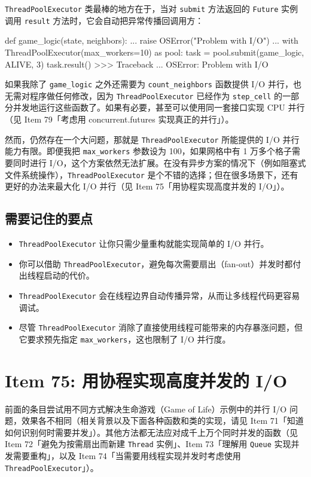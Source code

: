 \texttt{ThreadPoolExecutor} 类最棒的地方在于，当对 \texttt{submit} 方法返回的 \texttt{Future} 实例调用 \texttt{result} 方法时，它会自动把异常传播回调用方：

\begin{codebox}[python]
def game_logic(state, neighbors):
    ...
    raise OSError("Problem with I/O")
    ...
with ThreadPoolExecutor(max_workers=10) as pool:
    task = pool.submit(game_logic, ALIVE, 3)
    task.result()
>>>
Traceback ...
OSError: Problem with I/O
\end{codebox}

如果我除了 \texttt{game\_logic} 之外还需要为 \texttt{count\_neighbors} 函数提供 I/O 并行，也无需对程序做任何修改，因为 \texttt{ThreadPoolExecutor} 已经作为 \texttt{step\_cell} 的一部分并发地运行这些函数了。如果有必要，甚至可以使用同一套接口实现 CPU 并行（见 Item 79「考虑用 concurrent.futures 实现真正的并行」）。

然而，仍然存在一个大问题，那就是 \texttt{ThreadPoolExecutor} 所能提供的 I/O 并行能力有限。即便我把 \texttt{max\_workers} 参数设为 100，如果网格中有 1 万多个格子需要同时进行 I/O，这个方案依然无法扩展。在没有异步方案的情况下（例如阻塞式文件系统操作），\texttt{ThreadPoolExecutor} 是个不错的选择；但在很多场景下，还有更好的办法来最大化 I/O 并行（见 Item 75「用协程实现高度并发的 I/O」）。

\subsection{需要记住的要点}

\begin{itemize}
\item \texttt{ThreadPoolExecutor} 让你只需少量重构就能实现简单的 I/O 并行。
\item 你可以借助 \texttt{ThreadPoolExecutor}，避免每次需要扇出（fan-out）并发时都付出线程启动的代价。
\item \texttt{ThreadPoolExecutor} 会在线程边界自动传播异常，从而让多线程代码更容易调试。
\item 尽管 \texttt{ThreadPoolExecutor} 消除了直接使用线程可能带来的内存暴涨问题，但它要求预先指定 \texttt{max\_workers}，这也限制了 I/O 并行度。
\end{itemize}

\section{Item 75: 用协程实现高度并发的 I/O}

前面的条目尝试用不同方式解决生命游戏（Game of Life）示例中的并行 I/O 问题，效果各不相同（相关背景以及下面各种函数和类的实现，请见 Item 71「知道如何识别何时需要并发」）。其他方法都无法应对成千上万个同时并发的函数（见 Item 72「避免为按需扇出而新建 \texttt{Thread} 实例」、Item 73「理解用 \texttt{Queue} 实现并发需要重构」，以及 Item 74「当需要用线程实现并发时考虑使用 \texttt{ThreadPoolExecutor}」）。

